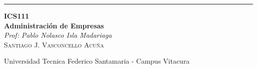 
\begin{titlepage} %
	
	\raggedleft %
	
	\rule{1pt}{\textheight} %
	\hspace{0.05\textwidth} %
	\parbox[b]{0.75\textwidth}{ %
		
		{\Huge\bfseries ICS111 \\[0.5\baselineskip] Administración de Empresas}\\[2\baselineskip] %
		{\large\textit{Prof: Pablo Nolasco Isla Madariaga}}\\[4\baselineskip] %
		{\Large\textsc{Santiago J. Vasconcello Acuña}} %
		
		\vspace{0.5\textheight} %
		
		{\noindent Universidad Tecnica Federico Santamaria - Campus Vitacura}\\[\baselineskip] %
	}

\end{titlepage}


